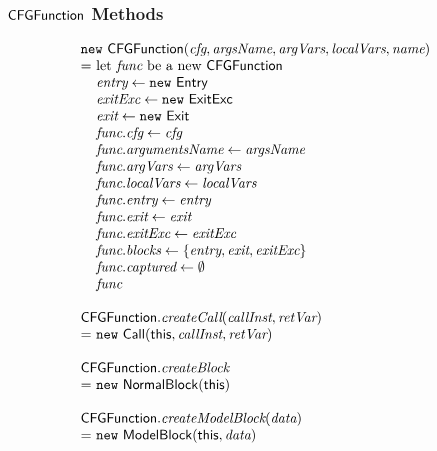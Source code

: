 \subsubsection{$\mbox{\textsf{CFGFunction}}$ Methods}
\[
\begin{array}{l@{}l@{~}l}
\lefteqn{\new\ \CFGFunction(\emph{cfg}, \emph{argsName}, \emph{argVars}, \emph{localVars}, \emph{name})}\\
& = & \text{let } \emph{func} \text{ be a new } \CFGFunction\\
& & \emph{entry} \leftarrow \new\ \Entry\\
& & \emph{exitExc} \leftarrow \new\ \ExitExc\\
& & \emph{exit} \leftarrow \new\ \Exit\\
& & \emph{func}.\emph{cfg} \leftarrow \emph{cfg} \\
& & \emph{func}.\emph{argumentsName} \leftarrow \emph{argsName} \\
& & \emph{func}.\emph{argVars} \leftarrow \emph{argVars}\\
& & \emph{func}.\emph{localVars} \leftarrow \emph{localVars}\\
& & \emph{func}.\emph{entry} \leftarrow \emph{entry}\\
& & \emph{func}.\emph{exit} \leftarrow \emph{exit}\\
& & \emph{func}.\emph{exitExc} \leftarrow \emph{exitExc}\\
& & \emph{func}.\emph{blocks} \leftarrow \{ \emph{entry}, \emph{exit}, \emph{exitExc} \}
~~~~~~~~~~~~~~~~~~~~~~~~~~~~\\
& & \emph{func}.\emph{captured} \leftarrow \emptyset\\
& & \emph{func}\\
& & \\

\lefteqn{\CFGFunction.\emph{createCall}(\emph{callInst}, \emph{retVar})}\\
& = & \new\ \Call(\this, \emph{callInst}, \emph{retVar})\\
& & \\

\lefteqn{\CFGFunction.\emph{createBlock}}\\
& = & \new\ \NormalBlock(\this)\\
& & \\

\lefteqn{\CFGFunction.\emph{createModelBlock}(\emph{data})}\\
& = & \new\ \ModelBlock(\this, \emph{data})\\
\end{array}
\]


